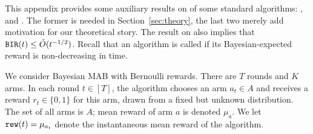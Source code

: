

\newcommand{\ExplorExploit}{\term{ExplorExploit}}
\newcommand{\PhasedExplorExploit}{\term{PhasedExplorExploit}}
\newcommand{\SuccesiveEliminationReset}{\term{SuccesiveEliminationReset}}

\newcommand{\IReg}{R^{\term{inst}}} %




This appendix provides some auxiliary results on \bmonotonicity of some standard algorithms: \DynGreedy, \DynamicEpsGreedy and \Thompson. The former is needed in Section~\ref{sec:theory}, the last two merely add motivation for our theoretical story. The result on \Thompson also implies that $\mathtt{BIR}(t)\leq \tilde{O}(t^{-1/2})$. Recall that an algorithm is called \bmonotone if its Bayesian-expected reward is non-decreasing in time.

We consider Bayesian MAB with Bernoulli rewards. There are $T$ rounds and $K$ arms. In each round $t\in [T]$, the algorithm chooses an arm $a_t\in A$ and receives a reward $r_t\in\{0,1\}$ for this arm, drawn from a fixed but unknown distribution. The set of all arms is $A$; mean reward of arm $a$ is denoted $\mu_a$. 
We let
    $\mathtt{rew}(t) = \mu_{a_t}$
denote the instantaneous mean reward of the algorithm.


